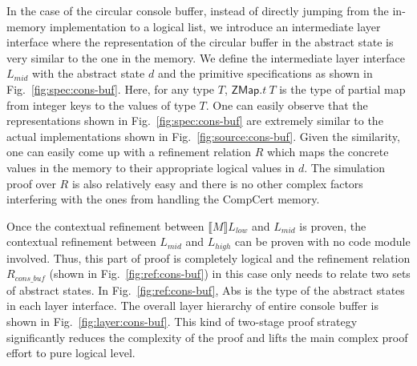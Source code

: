 In the case of the circular console buffer, instead of directly jumping from
the in-memory implementation to a logical list, we introduce an intermediate
layer interface where the representation of the circular buffer in the abstract
state is very similar to the one in the memory. We define the intermediate
layer interface $L_{mid}$ with the abstract state $d$ and the primitive specifications
as shown in Fig.~\ref{fig:spec:cons-buf}. Here, for any type $T$, $\mathsf{ZMap}.t~T$
is the type of partial map from integer keys to the values of type $T$.
One can easily observe that the representations shown in Fig.~\ref{fig:spec:cons-buf} are
extremely similar to the actual implementations shown in Fig.~\ref{fig:source:cons-buf}.
Given the similarity, one can easily come up with a refinement relation $R$ which
maps the concrete values in the memory to their appropriate logical values in $d$.
The simulation proof over $R$ is also relatively easy and there is no other
complex factors interfering with the ones from handling the CompCert memory.

Once the contextual refinement between $\llbracket{}M\rrbracket{}L_{low}$ and
$L_{mid}$ is proven, the contextual refinement between $L_{mid}$ and $L_{high}$
can be proven with no code module involved. Thus, this part of proof is completely
logical and the refinement relation $R_{cons\_buf}$ (shown in Fig.~\ref{fig:ref:cons-buf})
in this case only needs to relate two sets of abstract states.
In Fig.~\ref{fig:ref:cons-buf}, \textsf{Abs} is the type of the abstract states
in each layer interface.
The overall layer hierarchy of entire console buffer is shown in Fig.~\ref{fig:layer:cons-buf}.
This kind of two-stage proof strategy
significantly reduces the complexity
of the proof and lifts the main complex proof effort to pure logical level.

